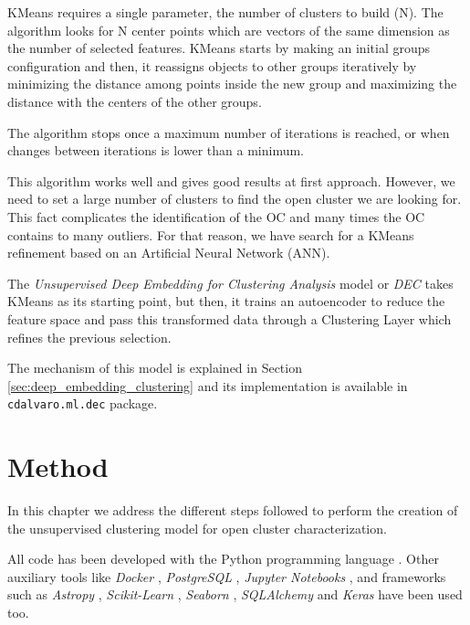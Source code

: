 \documentclass[11pt, a4paper, english]{book}
\begin{document}
KMeans requires a single parameter, the number of clusters to build (N).
The algorithm looks for N center points which are vectors of the same dimension as the number of selected features.
KMeans starts by making an initial groups configuration and then, it reassigns objects to other groups iteratively by minimizing
the distance among points inside the new group and maximizing the distance with the centers of the other groups.

The algorithm stops once a maximum number of iterations is reached, or when changes between iterations is lower than a minimum.

This algorithm works well and gives good results at first approach.
However, we need to set a large number of clusters to find the open cluster we are looking for.
This fact complicates the identification of the OC and many times the OC contains to many outliers.
For that reason, we have search for a KMeans refinement based on an Artificial Neural Network (ANN).

The \emph{Unsupervised Deep Embedding for Clustering Analysis} model or \emph{DEC} \cite{xie2016unsupervised} takes KMeans as its starting point,
but then, it trains an autoencoder to reduce the feature space and pass this transformed data through a Clustering Layer which refines the previous selection.

The mechanism of this model is explained in Section \ref{sec:deep_embedding_clustering} and its implementation is available in \verb|cdalvaro.ml.dec| package.

\chapter{Method}
\label{chap:method}

In this chapter we address the different steps followed to perform the creation of the unsupervised clustering model for open cluster characterization.

All code has been developed with the Python programming language \cite{Python3}. Other auxiliary tools like \emph{Docker} \cite{merkel2014docker},
\emph{PostgreSQL} \cite{postgresql}, \emph{Jupyter Notebooks} \cite{Kluyver2016jupyter}, and frameworks such as \emph{Astropy} \cite{astropy:2013} \cite{astropy:2018},
\emph{Scikit-Learn} \cite{scikit-learn}, \emph{Seaborn} \cite{michael_waskom_2017_883859}, \emph{SQLAlchemy} \cite{sqlalchemy} and
\emph{Keras} \cite{chollet2015keras} have been used too.
\end{document}
